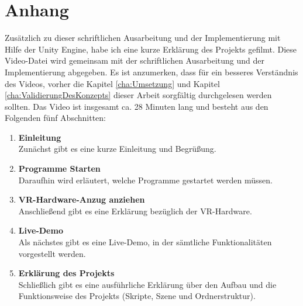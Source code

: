 \chapter*{Anhang} \label{cha:Anhang}

Zusätzlich zu dieser schriftlichen Ausarbeitung und der Implementierung mit Hilfe der Unity Engine, habe ich eine kurze Erklärung des Projekts gefilmt. Diese Video-Datei wird gemeinsam mit der schriftlichen Ausarbeitung und der Implementierung abgegeben. Es ist anzumerken, dass für ein besseres Verständnis des Videos, vorher die Kapitel \ref{cha:Umsetzung} und Kapitel \ref{cha:ValidierungDesKonzepts} dieser Arbeit sorgfältig durchgelesen werden sollten. Das Video ist insgesamt ca. 28 Minuten lang und besteht aus den Folgenden fünf Abschnitten:
\begin{enumerate}
	\item \textbf{Einleitung} \\
	Zunächst gibt es eine kurze Einleitung und Begrüßung.
	\item \textbf{Programme Starten} \\
	Daraufhin wird erläutert, welche Programme gestartet werden müssen.
	\item \textbf{VR-Hardware-Anzug anziehen} \\
	Anschließend gibt es eine Erklärung bezüglich der VR-Hardware.
	\item \textbf{Live-Demo} \\
	Als nächstes gibt es eine Live-Demo, in der sämtliche Funktionalitäten vorgestellt werden.
	\item \textbf{Erklärung des Projekts} \\
	Schließlich gibt es eine ausführliche Erklärung über den Aufbau und die Funktionsweise des Projekts (Skripte, Szene und Ordnerstruktur).
\end{enumerate}
